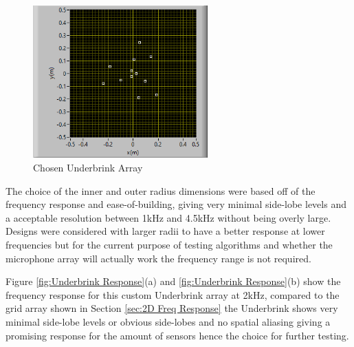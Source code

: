 \documentclass{UoNMCHA}
\numberwithin{equation}{section}
\begin{document}
    \begin{figure} [H]
        \centering
        \includegraphics[keepaspectratio, width = 0.6\textwidth]{Figures/CurrentTestingArray.png}
        \caption{Chosen Underbrink Array}
        \label{fig:Testing Array}
    \end{figure}
    
    The choice of the inner and outer radius dimensions were based off of the frequency response and ease-of-building, giving very minimal side-lobe levels and a acceptable resolution between 1kHz and 4.5kHz without being overly large. Designs were considered with larger radii to have a better response at lower frequencies but for the current purpose of testing algorithms and whether the microphone array will actually work the frequency range is not required.
    
    Figure \ref{fig:Underbrink Response}(a) and \ref{fig:Underbrink Response}(b) show the frequency response for this custom Underbrink array at 2kHz, compared to the grid array shown in Section \ref{sec:2D Freq Response} the Underbrink shows very minimal side-lobe levels or obvious side-lobes and no spatial aliasing giving a promising response for the amount of sensors hence the choice for further testing.  
\end{document}
